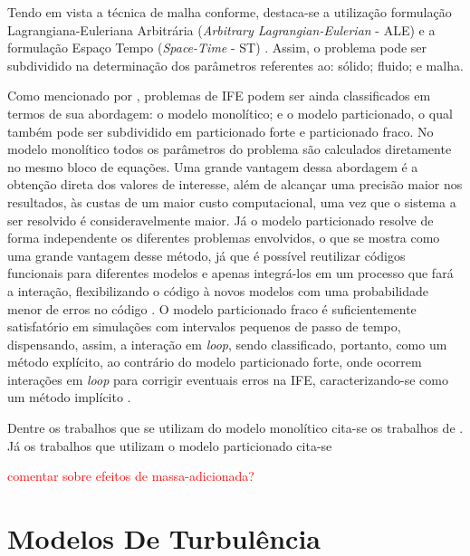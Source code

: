 \documentclass[_ArquivoPrincipal.tex]{subfiles}
\begin{document}
Tendo em vista a técnica de malha conforme, destaca-se a utilização formulação Lagrangiana-Euleriana Arbitrária (\textit{Arbitrary Lagrangian-Eulerian} - ALE) \cite{donea1982arbitrary,kanchi20073d} e a formulação Espaço Tempo (\textit{Space-Time} - ST) \cite{takizawa2011multiscale,terahara2020heart,takizawa2011stabilized}. Assim, o problema pode ser subdividido na determinação dos parâmetros referentes ao: sólido; fluido; e malha.

Como mencionado por , problemas de IFE podem ser ainda classificados em termos de sua abordagem: o modelo monolítico; e o modelo particionado, o qual também pode ser subdividido em particionado forte e particionado fraco. No modelo monolítico todos os parâmetros do problema são calculados diretamente no mesmo bloco de equações. Uma grande vantagem dessa abordagem é a obtenção direta dos valores de interesse, além de alcançar uma precisão maior nos resultados, às custas de um maior custo computacional, uma vez que o sistema a ser resolvido é consideravelmente maior. Já o modelo particionado resolve de forma independente os diferentes problemas envolvidos, o que se mostra como uma grande vantagem desse método, já que é possível reutilizar códigos funcionais para diferentes modelos e apenas integrá-los em um processo que fará a interação, flexibilizando o código à novos modelos com uma probabilidade menor de erros no código \cite{roux2008domain,hou2012numerical}. O modelo particionado fraco é suficientemente satisfatório em simulações com intervalos pequenos de passo de tempo, dispensando, assim, a interação em \textit{loop}, sendo classificado, portanto, como um método explícito, ao contrário do modelo particionado forte, onde ocorrem interações em \textit{loop} para corrigir eventuais erros na IFE, caracterizando-se como um método implícito \cite{fernandes2020tecnica}.

Dentre os trabalhos que se utilizam do modelo monolítico cita-se os trabalhos de . Já os trabalhos que utilizam o modelo particionado cita-se 

\textcolor{red}{comentar sobre efeitos de massa-adicionada?}

\section{Modelos De Turbulência} \label{MT}
\end{document}

